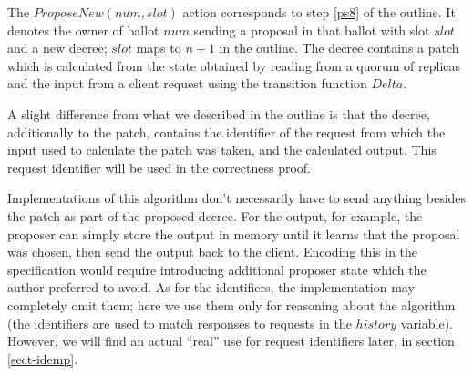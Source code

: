\documentclass[12pt,a4paper,en]{pracamgr}
\begin{document}
The $ProposeNew(num, slot)$ action corresponds to step \ref{ps8} of the outline. It denotes the owner of ballot $num$ sending a proposal in that ballot with slot $slot$ and a new decree; $slot$ maps to $n+1$ in the outline. The decree contains a patch which is calculated from the state obtained by reading from a quorum of replicas and the input from a client request using the transition function $Delta$.

A slight difference from what we described in the outline is that the decree, additionally to the patch, contains the identifier of the request from which the input used to calculate the patch was taken, and the calculated output. This request identifier will be used in the correctness proof.

Implementations of this algorithm don't necessarily have to send anything besides the patch as part of the proposed decree. For the output, for example, the proposer can simply store the output in memory until it learns that the proposal was chosen, then send the output back to the client. Encoding this in the specification would require introducing additional proposer state which the author preferred to avoid. As for the identifiers, the implementation may completely omit them; here we use them only for reasoning about the algorithm (the identifiers are used to match responses to requests in the $history$ variable). However, we will find an actual ``real'' use for request identifiers later, in section \ref{sect-idemp}.
\end{document}
